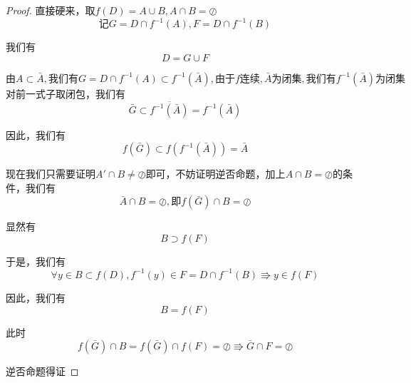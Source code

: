 \documentclass[lang=cn,10pt]{elegantbook}
\begin{document}
	\begin{proof}
		
		直接硬来，取$f(D)=A\cup B,A\cap B=\oslash$
		\begin{equation*}
			\text{记}G=D\cap f^{-1}\left( A \right) ,F=D\cap f^{-1}\left( B \right) 
		\end{equation*}
		
		我们有
		\begin{equation*}
			D=G\cup F
		\end{equation*}
		
		$\text{由}A\subset \bar{A},\text{我们有}G=D\cap f^{-1}\left( A \right) \subset f^{-1}(\bar{A}),\text{由于}f\text{连续},\bar{A}\text{为闭集},\text{我们有}f^{-1}\left( \bar{A} \right) \text{为闭集}$对前一式子取闭包，我们有
		\begin{equation*}
			\bar{G}\subset \overline{f^{-1}(\bar{A})}=f^{-1}\left( \bar{A} \right) 
		\end{equation*}
		
		因此，我们有
		\begin{equation*}
			f\left( \bar{G} \right) \subset f\left( f^{-1}\left( \bar{A} \right) \right) =\bar{A}
		\end{equation*}
		
		现在我们只需要证明$A'\cap B\ne \oslash$即可，不妨证明逆否命题，加上$A\cap B=\oslash$的条件，我们有
		\begin{equation*}
			\bar{A}\cap B=\oslash,\text{即}f\left( \bar{G} \right) \cap B=\oslash 
		\end{equation*}
		
		显然有
		\begin{equation*}
			B\supset f\left( F \right) 
		\end{equation*}
		
		于是，我们有
		\begin{equation*}
			\forall y\in B\subset f\left( D \right) ,f^{-1}\left( y \right) \in F=D\cap f^{-1}\left( B \right) \Rrightarrow y\in f\left( F \right) 
		\end{equation*}
		
		因此，我们有
		\begin{equation*}
			B=f\left( F \right) 
		\end{equation*}
		
		此时
		\begin{equation*}
			f\left( \bar{G} \right) \cap B=f\left( \bar{G} \right) \cap f\left( F \right) =\oslash \Rrightarrow \bar{G}\cap F=\oslash 
		\end{equation*}
		
		逆否命题得证
	\end{proof}
\end{document}
